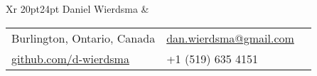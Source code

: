 \documentclass[9pt]{extarticle}
\makeatletter
\newcommand\HUGE{\@setfontsize\Huge{20pt}{24pt}}
\makeatother
\begin{document}
{
    \begin{tabularx}{\textwidth}{Xr}
    {\HUGE\leavevmode\color{em-light} Daniel Wierdsma} &
        \null\hfill\small\begin{tabular}{llX}
            \faMapMarker\space\space\space\color{darkgrey} Burlington, Ontario, Canada & \faEnvelope\space\space\color{darkgrey} \href{mailto:dan.wierdsma@gmail.com}{dan.wierdsma@gmail.com} \\[3px]
            \faGithub\space\space\color{darkgrey} \href{https://github.com/d-wierdsma}{github.com/d-wierdsma} & {\large\faMobilePhone}\space\space\space\color{darkgrey} +1 (519) 635 4151 \\[10px]
        \end{tabular}
    \end{tabularx}

    {\color{lightgrey}{\centerline{\rule{17cm}{0.4pt}}}}
}
\end{document}
